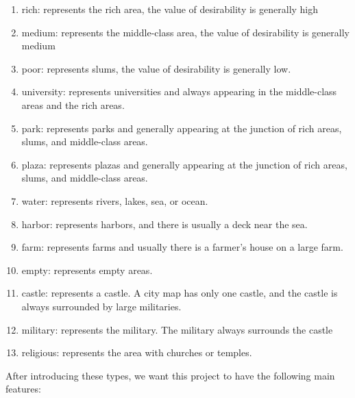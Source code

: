 \begin{enumerate}
  \item rich: represents the rich area, the value of desirability is generally high
  \item medium: represents the middle-class area, the value of desirability is generally medium
  \item poor: represents slums, the value of desirability is generally low.
  \item university: represents universities and always appearing in the middle-class areas and the rich areas.
  \item park: represents parks and generally appearing at the junction of rich areas,  slums, and middle-class areas.
  \item plaza: represents plazas and generally appearing at the junction of rich areas,  slums, and middle-class areas.
  \item water: represents rivers, lakes, sea, or ocean.
  \item harbor: represents harbors, and there is usually a deck near the sea.
  \item farm: represents farms and usually there is a farmer’s house on a large farm.
  \item empty: represents empty areas.
  \item castle: represents a castle. A city map has only one castle, and the castle is always surrounded by large militaries.
  \item military: represents the military. The military always surrounds the castle
  \item religious: represents the area with churches or temples.
\end{enumerate}

After introducing these types, we want this project to have the following main features:

